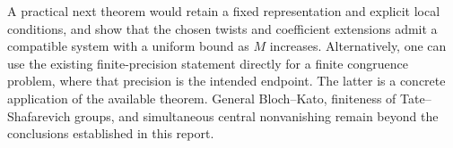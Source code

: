 A practical next theorem would retain a fixed representation and
explicit local conditions, and show that the chosen twists and
coefficient extensions admit a compatible system with a uniform
bound as $M$ increases. Alternatively, one can use the existing
finite-precision statement directly for a finite congruence problem,
where that precision is the intended endpoint. The latter is a
concrete application of the available theorem. General
Bloch--Kato, finiteness of Tate--Shafarevich groups, and simultaneous
central nonvanishing remain beyond the conclusions established in
this report.
